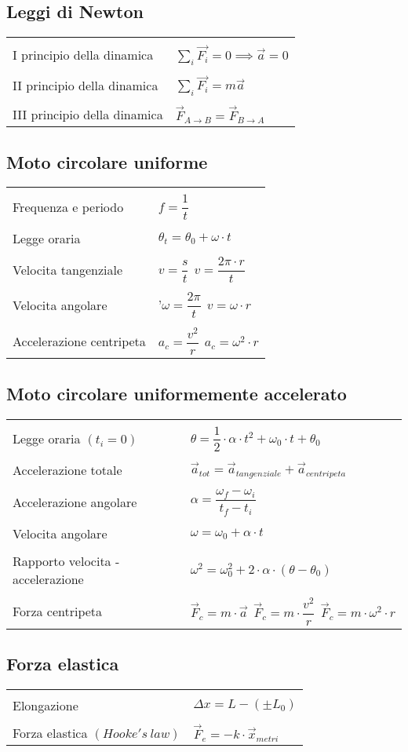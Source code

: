 \documentclass[11pt]{article}
\def\nt{\\[3mm]\hline\\[-2mm]}
\def\nnt{\hline\\[-2mm]}
\def\tnn{\\[2mm]\hline}
\begin{document}
\subsection{Leggi di Newton}

\begin{tabular}{| p{9.5cm} | p{9.5cm} |}
	\nnt
	I principio della dinamica & \texttt{$\sum_i\vec{F_i} = 0 \implies \vec{a} = 0$} \nt
	II principio della dinamica & \texttt{$\sum_i\vec{F_i} = m\vec{a}$} \nt
	III principio della dinamica & \texttt{$\vec{F}_{A\rightarrow B} = \vec{F}_{B\rightarrow A}$} \tnn
\end{tabular}

\subsection{Moto circolare uniforme}

\begin{tabular}{| p{9.5cm} | p{9.5cm} |}
	\nnt
	Frequenza e periodo & \texttt{$f = \dfrac{1}{t}$} \nt
	Legge oraria & \texttt{$\theta_t = \theta_0 + \omega \cdot t$} \nt
	Velocita tangenziale & \texttt{$v = \dfrac{s}{t}\ \ v = \dfrac{2\pi \cdot r}{t}$} \nt
	Velocita angolare & '\texttt{$\omega = \dfrac{2\pi}{t}\ \ v = \omega \cdot r$} \nt
	Accelerazione centripeta & \texttt{$a_c = \dfrac{v^2}{r}\ \ a_c = \omega^2 \cdot r$} \tnn
	
\end{tabular}

\subsection{Moto circolare uniformemente accelerato}

\begin{tabular}{| p{9.5cm} | p{9.5cm} |}
\nnt
Legge oraria $(t_i = 0)$ & \texttt{$\theta = \dfrac12 \cdot \alpha \cdot t^2 + \omega_0 \cdot t + \theta_0$} \nt
Accelerazione totale & \texttt{$\vec{a}_{tot} = \vec{a}_{tangenziale} + \vec{a}_{centripeta}$} \nt
Accelerazione angolare & \texttt{$\alpha = \dfrac{\omega_f - \omega_i}{t_f - t_i}$} \nt
Velocita angolare & \texttt{$\omega = \omega_0 + \alpha \cdot t$} \nt
Rapporto velocita - accelerazione & \texttt{$\omega^2 = \omega_0^2 + 2 \cdot \alpha \cdot (\theta - \theta_0)$} \nt
Forza centripeta & \texttt{$\vec{F}_c = m \cdot \vec{a}\ \ \vec{F}_c = m \cdot \dfrac{v^2}{r}\ \ \vec{F}_c = m \cdot \omega^2 \cdot r$} \tnn

\end{tabular}

\subsection{Forza elastica}

\begin{tabular}{| p{9.5cm} | p{9.5cm} |}
\nnt
Elongazione & \texttt{$\Delta x = L - (\pm L_0)$} \nt
Forza elastica $(Hooke's\ law)$ & \texttt{$\vec{F}_e = -k \cdot \vec{x}_{metri}$} \tnn

\end{tabular}
\end{document}
